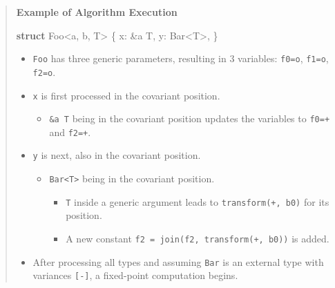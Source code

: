 \documentclass[
  11pt,
  twoside,symmetric]{report}
\newenvironment{Shaded}{}{}
\newcommand{\KeywordTok}[1]{\textbf{#1}}
\newcommand{\NormalTok}[1]{#1}
\newcommand{\OperatorTok}[1]{#1}
\newcommand{\OtherTok}[1]{#1}
\providecommand{\tightlist}{%
  \setlength{\itemsep}{0pt}\setlength{\parskip}{0pt}}
\begin{document}
\begin{quote}
\textbf{Example of Algorithm Execution}

\begin{Shaded}
\begin{Highlighting}[]
 \KeywordTok{struct}\NormalTok{ Foo}\OperatorTok{\textless{}}\OtherTok{\textquotesingle{}a}\OperatorTok{,} \OtherTok{\textquotesingle{}b}\OperatorTok{,}\NormalTok{ T}\OperatorTok{\textgreater{}} \OperatorTok{\{}
\NormalTok{     x}\OperatorTok{:} \OperatorTok{\&}\OtherTok{\textquotesingle{}a}\NormalTok{ T}\OperatorTok{,}
\NormalTok{     y}\OperatorTok{:}\NormalTok{ Bar}\OperatorTok{\textless{}}\NormalTok{T}\OperatorTok{\textgreater{},}
 \OperatorTok{\}}
\end{Highlighting}
\end{Shaded}

\begin{itemize}
\tightlist
\item
  \texttt{Foo} has three generic parameters, resulting in 3 variables:
  \texttt{f0=o}, \texttt{f1=o}, \texttt{f2=o}.
\item
  \texttt{x} is first processed in the covariant position.

  \begin{itemize}
  \tightlist
  \item
    \texttt{\&\textquotesingle{}a\ T} being in the covariant position
    updates the variables to \texttt{f0=+} and \texttt{f2=+}.
  \end{itemize}
\item
  \texttt{y} is next, also in the covariant position.

  \begin{itemize}
  \tightlist
  \item
    \texttt{Bar\textless{}T\textgreater{}} being in the covariant
    position.

    \begin{itemize}
    \tightlist
    \item
      \texttt{T} inside a generic argument leads to
      \texttt{transform(+,\ b0)} for its position.
    \item
      A new constant \texttt{f2\ =\ join(f2,\ transform(+,\ b0))} is
      added.
    \end{itemize}
  \end{itemize}
\item
  After processing all types and assuming \texttt{Bar} is an external
  type with variances \texttt{{[}-{]}}, a fixed-point computation
  begins.


\end{itemize}
\end{quote}
\end{document}
